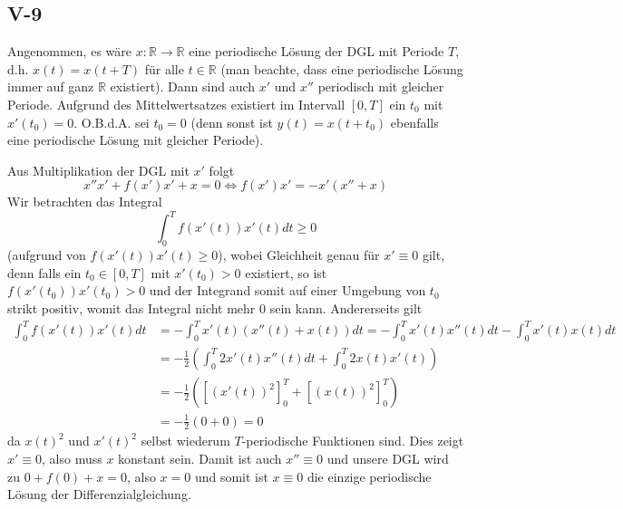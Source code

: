 \documentclass[a4paper]{article}
\begin{document}
\subsection{V-9}

Angenommen, es wäre $x: \mathds{R} \to \mathds{R}$ eine periodische Lösung der DGL mit Periode $T$, d.h. $x(t) = x(t + T)$ für alle $t \in \mathds{R}$ (man beachte, dass eine periodische Lösung immer auf ganz $\mathds{R}$ existiert).
Dann sind auch $x'$ und $x''$ periodisch mit gleicher Periode.
Aufgrund des Mittelwertsatzes existiert im Intervall $[0,T]$ ein $t_0$ mit $x'(t_0) = 0$.
O.B.d.A. sei $t_0 = 0$ (denn sonst ist $y(t) = x(t + t_0)$ ebenfalls eine periodische Lösung mit gleicher Periode).

Aus Multiplikation der DGL mit $x'$ folgt
\begin{equation*}
    x'' x' + f(x') x' + x = 0 \iff f(x') x' = - x' (x'' + x)
\end{equation*}
Wir betrachten das Integral
\begin{equation*}
    \int_0^T f(x'(t))x'(t) dt \geq 0
\end{equation*}
(aufgrund von $f(x'(t)) x'(t) \geq 0$), wobei Gleichheit genau für $x' \equiv 0$ gilt, denn falls ein $t_0 \in [0,T]$ mit $x'(t_0) > 0$ existiert, so ist $f(x'(t_0)) x'(t_0) > 0$ und der Integrand somit auf einer Umgebung von $t_0$ strikt positiv, womit das Integral nicht mehr $0$ sein kann.
Andererseits gilt
\begin{align*}
    \int_0^T f(x'(t))x'(t) dt &= - \int_0^T x'(t) (x''(t) + x(t)) dt = - \int_0^T x'(t) x''(t) dt  - \int_0^T x'(t) x(t) dt\\
    &= - \frac{1}{2} \left( \int_0^T 2 x'(t) x''(t) dt + \int_0^T 2 x(t) x'(t) \right)\\
    &= - \frac{1}{2} \left( \left[(x'(t))^2\right]_0^T + \left[(x(t))^2\right]_0^T  \right)\\
    &= - \frac{1}{2} (0 + 0) = 0
\end{align*}
da $x(t)^2$ und $x'(t)^2$ selbst wiederum $T$-periodische Funktionen sind.
Dies zeigt $x' \equiv 0$, also muss $x$ konstant sein.
Damit ist auch $x'' \equiv 0$ und unsere DGL wird zu $0 + f(0) + x = 0$, also $x = 0$ und somit ist $x \equiv 0$ die einzige periodische Lösung der Differenzialgleichung.
\end{document}
